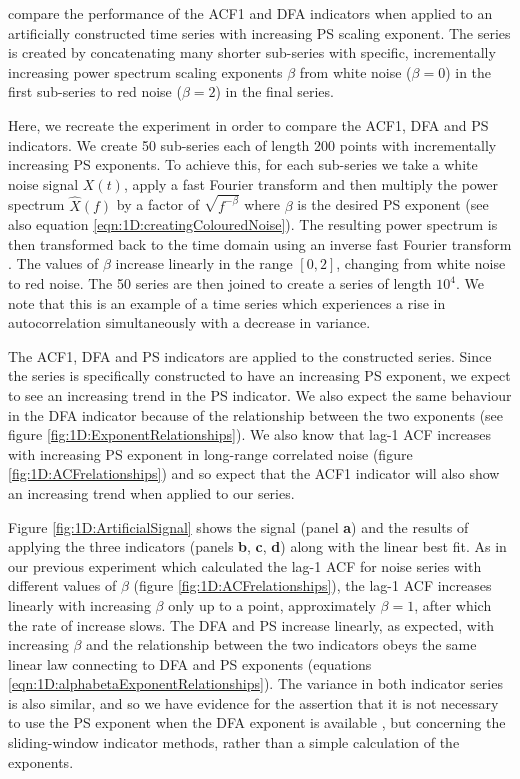 { \citet{livina2012} compare the performance of the ACF1 and DFA indicators when applied to an artificially constructed time series with increasing PS scaling exponent. The series is created by concatenating many shorter sub-series with specific, incrementally increasing power spectrum scaling exponents $\beta$ from white noise ($\beta=0$) in the first sub-series to red noise ($\beta=2$) in the final series.  
 
 Here, we recreate the experiment in order to compare the ACF1, DFA and PS indicators. We create 50 sub-series each of length 200 points with incrementally increasing PS exponents. To achieve this, for each sub-series we take a white noise signal $X(t)$, apply a fast Fourier transform and then multiply the power spectrum $\hat{X}(f)$ by a factor of $\sqrt{f^{-\beta}}$ where $\beta$ is the desired PS exponent (see also equation \ref{eqn:1D:creatingColouredNoise}). The resulting power spectrum is then transformed back to the time domain using an inverse fast Fourier transform \citep{makse1996}. The values of $\beta$ increase linearly in the range $[0, 2]$, changing from white noise to red noise. The 50 series are then joined to create a series of length $10^4$. We note that this is an example of a time series which experiences a rise in autocorrelation simultaneously with a decrease in variance. 
 
 
 
The ACF1, DFA and PS indicators are applied to the constructed series. Since the series is specifically constructed to have an increasing PS exponent, we expect to see an increasing trend in the PS indicator. We also expect the same behaviour in the DFA indicator because of the relationship between the two exponents (see figure \ref{fig:1D:ExponentRelationships}). We also know that lag-1 ACF increases with increasing PS exponent in long-range correlated noise (figure \ref{fig:1D:ACFrelationships}) and so expect that the ACF1 indicator will also show an increasing trend when applied to our series.

Figure \ref{fig:1D:ArtificialSignal} shows the signal (panel {\bf a}) and the results of applying the three indicators (panels {\bf b}, {\bf c}, {\bf d}) along with the linear best fit. As in our previous experiment which calculated the lag-1 ACF for noise series with different values of $\beta$ (figure \ref{fig:1D:ACFrelationships}), the lag-1 ACF increases linearly with increasing $\beta$ only up to a point, approximately $\beta = 1$, after which the rate of increase slows. The DFA and PS increase linearly, as expected, with increasing $\beta$ and the relationship between the two indicators obeys the same linear law connecting to DFA and PS exponents (equations \ref{eqn:1D:alphabetaExponentRelationships}). The variance in both indicator series is also similar, and so we have evidence for the assertion that it is not necessary to use the PS exponent when the DFA exponent is available \citep{heneghan2000}, but concerning the sliding-window indicator methods, rather than a simple calculation of the exponents.

}
